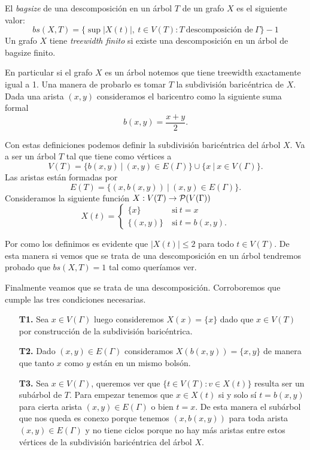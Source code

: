 \documentclass[tesis.tex]{subfiles}
\begin{document}
\begin{deff}
	El \emph{bagsize} de una descomposición en un árbol $T$ de un grafo $X$ es el siguiente valor:
	\begin{equation*}
		bs(X,T) = \{ \sup |X(t)|, \ t \in V(T) : T \ \text{descomposición de} \ \Gamma \} - 1
	\end{equation*}
	Un grafo $X$ tiene \emph{treewidth finito} si existe una descomposición en un árbol de bagsize finito.	
\end{deff}
\begin{ej}\label{desc-arbol-arbol}
	En particular si el grafo $X$ es un árbol notemos que tiene treewidth exactamente igual a 1.
	Una manera de probarlo es tomar $T$ la subdivisión baricéntrica de $X$. 
	Dada una arista $(x,y)$ consideramos el baricentro como la siguiente suma formal
	\[
	b(x,y)  = \frac{x+y}{2}.
	\]
	
	
	Con estas definiciones podemos definir la subdivisión baricéntrica del árbol $X$.
	Va a ser un árbol $T$ tal que tiene como vértices a 
	\[
	V(T) = \{ b(x,y) \ | \ (x,y) \in E(\Gamma) \} \cup \{  x \ | \ x \in V(\Gamma)  \}.
	\]
	Las aristas están formadas por 
	\[
	E(T) = \{  (x,b(x,y)) \ | \ (x,y) \in E(\Gamma) \}.
	\]
	Consideramos la siguiente función $X: V(T) \to {\cal P}(V(\Gamma))$  
	\[
	X(t) = 
	\begin{cases}
		\{ x \} \ & \text{si} \ t = x 				\\
		\{ (x,y)  \} \ &\text{si} \ t = b(x,y).
	\end{cases}
	\]
	
	Por como los definimos es evidente que $|X(t)| \le 2$ para todo $t \in V(T)$.
	De esta manera si vemos que se trata de una descomposición en un árbol tendremos probado que $bs(X,T) = 1$ tal como queríamos ver.
	
	Finalmente veamos que se trata de una descomposición. Corroboremos que cumple las tres condiciones necesarias.
	\begin{enumerate}
		\item[\textbf{T1.}] 
		Sea $x \in V(\Gamma)$ luego consideremos $X(x) = \{ x \}$ dado que $x \in V(T)$ por construcción de la subdivisión baricéntrica.
		
		\item[\textbf{T2.}] 
		Dado $(x,y) \in E(\Gamma)$ consideramos $X({b(x,y)}) = \{ x,y \} $ de manera que tanto $x$ como $y$ están en un mismo bolsón.
		
		\item[\textbf{T3.}] 
		Sea $x \in V(\Gamma)$, queremos ver que $\{ t \in V(T) :  v \in X(t) \}$ resulta ser un subárbol de $T$.		
		Para empezar tenemos que $x \in X(t)$ si y solo sí $t = b(x,y)$ para cierta arista $(x,y) \in E(\Gamma)$ o bien $t = x$.
		De esta manera el subárbol que nos queda es conexo porque tenemos $(x,b(x,y))$ para toda arista $(x,y) \in E(\Gamma)$ y no tiene ciclos porque no hay más aristas entre estos vértices de la subdivisión baricéntrica del árbol $X$.
	\end{enumerate}
\end{ej}
\end{document}
